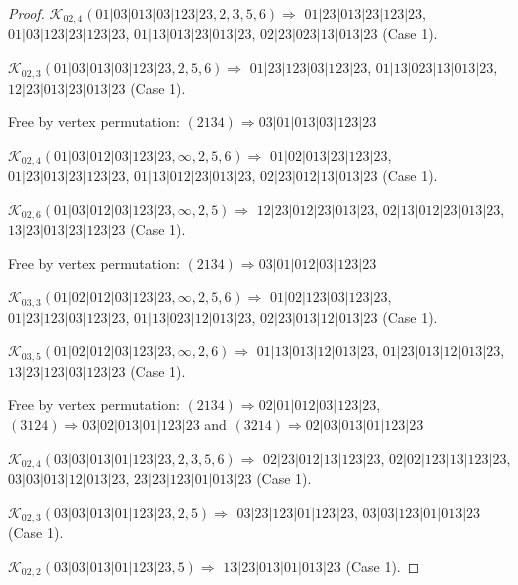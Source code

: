 \documentclass[12pt]{article}
\theoremstyle{plain}
\theoremstyle{definition}
\theoremstyle{remark}
\newcommand{\fancy}[1]{\mathcal{#1}}
\def\K{\fancy{K}}
\begin{document}
\begin{proof}
	
	
	\bigskip
	
	$\K_{02,4}(01|03|013|03|123|23,2, 3, 5, 6)\Rightarrow $ $01|23|013|23|123|23$, $01|03|123|23|123|23$, $01|13|013|23|013|23$, $02|23|023|13|013|23$ (Case 1).
	
	$\K_{02,3}(01|03|013|03|123|23,2, 5, 6)\Rightarrow $ $01|23|123|03|123|23$, $01|13|023|13|013|23$, $12|23|013|23|013|23$ (Case 1).
	
	
	
	Free by vertex permutation: $(2 1 3 4)\Rightarrow 03|01|013|03|123|23$
	
	
	
	\bigskip
	
	$\K_{02,4}(01|03|012|03|123|23,\infty,2, 5, 6)\Rightarrow $ $01|02|013|23|123|23$, $01|23|013|23|123|23$, $01|13|012|23|013|23$, $02|23|012|13|013|23$ (Case 1).
	
	$\K_{02,6}(01|03|012|03|123|23,\infty,2, 5)\Rightarrow $ $12|23|012|23|013|23$, $02|13|012|23|013|23$, $13|23|013|23|123|23$ (Case 1).
	
	
	
	Free by vertex permutation: $(2 1 3 4)\Rightarrow 03|01|012|03|123|23$
	
	
	
	\bigskip
	
	$\K_{03,3}(01|02|012|03|123|23,\infty,2, 5, 6)\Rightarrow $ $01|02|123|03|123|23$, $01|23|123|03|123|23$, $01|13|023|12|013|23$, $02|23|013|12|013|23$ (Case 1).
	
	$\K_{03,5}(01|02|012|03|123|23,\infty,2, 6)\Rightarrow $ $01|13|013|12|013|23$, $01|23|013|12|013|23$, $13|23|123|03|123|23$ (Case 1).
	
	
	
	Free by vertex permutation: $(2 1 3 4)\Rightarrow 02|01|012|03|123|23$, $(3 1 2 4)\Rightarrow 03|02|013|01|123|23$ and $(3 2 1 4)\Rightarrow 02|03|013|01|123|23$
	
	
	
	\bigskip
	
	$\K_{02,4}(03|03|013|01|123|23,2, 3, 5, 6)\Rightarrow $ $02|23|012|13|123|23$, $02|02|123|13|123|23$, $03|03|013|12|013|23$, $23|23|123|01|013|23$ (Case 1).
	
	$\K_{02,3}(03|03|013|01|123|23,2, 5)\Rightarrow $ $03|23|123|01|123|23$, $03|03|123|01|013|23$ (Case 1).
	
	$\K_{02,2}(03|03|013|01|123|23,5)\Rightarrow $ $13|23|013|01|013|23$ (Case 1).
	
	
	\bigskip
	

\end{proof}
\end{document}
